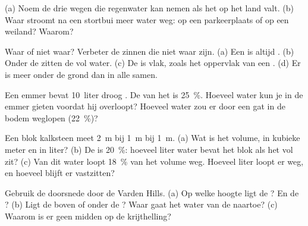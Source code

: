 \begin{exercise}[$\star$]\label{exo:g6:water-underground:3}
(a) Noem de drie wegen die regenwater kan nemen als het op het land valt.
(b) Waar stroomt na een stortbui meer water weg: op een parkeerplaats of op
een weiland? Waarom?
\end{exercise}

\begin{exercise}[$\star$]\label{exo:g6:water-underground:4}
Waar of niet waar? Verbeter de zinnen die niet waar zijn. (a) Een 
 is altijd . (b) Onder de  zitten de
 vol water. (c) De  is vlak, zoals het oppervlak
van een . (d) Er is meer  onder de grond dan in alle 
samen.
\end{exercise}

\begin{exercise}[$\star\star$]\label{exo:g6:water-underground:5}
Een emmer bevat 10~liter droog . De  van het  is
25~\%. Hoeveel water kun je in de emmer gieten voordat hij overloopt?
Hoeveel water zou er door een gat in de bodem weglopen (22~\%)?
\end{exercise}

\begin{exercise}[$\star\star$]\label{exo:g6:water-underground:6}
Een blok kalksteen meet 2~m bij 1~m bij 1~m. (a) Wat is het volume, in
kubieke meter en in liter? (b) De  is 20~\%: hoeveel liter water
bevat het blok als het vol zit? (c) Van dit water loopt 18~\% van het
volume weg. Hoeveel liter loopt er weg, en hoeveel blijft er vastzitten?
\end{exercise}

\begin{exercise}[$\star\star$]\label{exo:g6:water-underground:7}
Gebruik de doorsnede door de Varden Hills. (a) Op welke hoogte ligt de
? En de ? (b) Ligt de  boven of onder de ? Waar gaat
het water van de  naartoe? (c) Waarom is er geen  midden op de
krijthelling?
\end{exercise}

